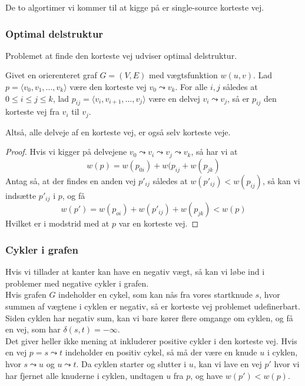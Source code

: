 De to algortimer vi kommer til at kigge på er single-source korteste vej.\\

\subsubsection{Optimal delstruktur}
Problemet at finde den korteste vej udviser optimal delstruktur.

\begin{lemma}
  Givet en orierenteret graf $G = (V,E)$ med vægtsfunktion $w(u,v)$. Lad $p = \langle v_0, v_1, ..., v_k\rangle$ være den korteste vej $v_0 \leadsto v_k$. For alle $i,j$ således at $0 \leq i \leq j \leq k$, lad $p_{ij} = \langle v_i, v_{i+1}, ..., v_j\rangle$ være en delvej $v_i \leadsto v_j$, så er $p_{ij}$ den korteste vej fra $v_i$ til $v_j$.
\end{lemma}
Altså, alle delveje af en korteste vej, er også selv korteste veje.\\

\begin{proof}
  Hvis vi kigger på delvejene $v_0 \leadsto v_i \leadsto v_j \leadsto v_k$, så har vi at
  $$w(p) = w(p_{0i}) + w(p_{ij} + w(p_{jk})$$
  Antag så, at der findes en anden vej $p'_{ij}$ således at $w(p'_{ij}) < w(p_{ij})$, så kan vi indsætte $p'_{ij}$ i $p$, og få
  $$w(p') = w(p_{oi}) + w(p'_{ij}) + w(p_{jk}) < w(p)$$
  Hvilket er i modstrid med at $p$ var en korteste vej.
\end{proof}


\subsubsection{Cykler i grafen}
Hvis vi tillader at kanter kan have en negativ vægt, så kan vi løbe ind i problemer med negative cykler i grafen.\\
Hvis grafen $G$ indeholder en cykel, som kan nås fra vores startknude $s$, hvor summen af vægtene i cyklen er negativ, så er korteste vej problemet udefinerbart. Siden cyklen har negativ sum, kan vi bare kører flere omgange om cyklen, og få en vej, som har $\delta(s,t) = -\infty$.\\

Det giver heller ikke mening at inkluderer positive cykler i den korteste vej. Hvis en vej $p = s \leadsto t$ indeholder en positiv cykel, så må der være en knude $u$ i cyklen, hvor $s \leadsto u$ og $u \leadsto t$. Da cyklen starter og slutter i $u$, kan vi lave en vej $p'$ hvor vi har fjernet alle knuderne i cyklen, undtagen $u$ fra $p$, og have $w(p') < w(p)$.\\

